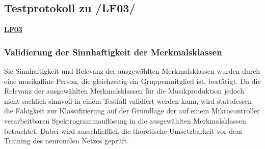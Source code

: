 \subsection{Testprotokoll zu /LF03/}
\label{sec:nn-test-protocol}

\textbf{\hyperlink{lf-nn-01}{LF03}}

\subsubsection{Validierung der Sinnhaftigkeit der Merkmalsklassen}
Sie Sinnhaftigkeit und Relevanz der ausgewählten Merkmalsklassen wurden durch eine musikaffine Person, die gleichzeitig ein Gruppenmitglied ist, bestätigt.
Da die Relevanz der ausgewählten Merkmalsklassen für die Musikproduktion jedoch nicht sachlich sinnvoll in einem Testfall validiert werden kann, wird stattdessen die Fähigkeit zur Klassifizierung auf der Grundlage der auf einem Mikrocontroller verarbeitbaren Spektrogrammauflösung in die ausgewählten Merkmalsklassen betrachtet. Dabei wird ausschließlich die thoretische Umsetzbarkeit vor dem Training des neuronalen Netzes geprüft.

